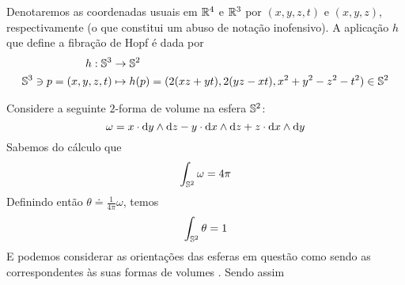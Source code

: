\begin{oobs}
Denotaremos as coordenadas usuais em $\R^4$ e $\R^3$ por $(x, y, z, t)$ e $(x, y, z)$, respectivamente (o que constitui um abuso de notação inofensivo). A aplicação $h$ que define a fibração de Hopf é dada por
\[
\begin{aligned}
h: \S^3 &\to \S^2 \\
\S^3 \ni p = (x, y, z, t) &\mapsto h(p) = (2(xz+yt), 2(yz-xt), x^2 + y^2 - z^2 - t^2) \in \S^2
\end{aligned}
\]
\end{oobs}
\begin{dem}
Considere a seguinte $2$-forma de volume  na esfera $\S^2$:
\[
\omega = x \cdot \dd y \wg \dd z - y \cdot \dd x  \wg \dd z + z \cdot  \dd x \wg \dd y
\]
Sabemos do cálculo que 
\[
\int_{\S^2} \omega= 4 \pi 
\]
Definindo então $\theta \doteq \frac{1}{4 \pi} \omega$, temos
\[
\int_{\S^2} \theta = 1
\]
E podemos considerar as orientações das esferas em questão como sendo as correspondentes às suas formas de volumes . Sendo assim


\end{dem}

